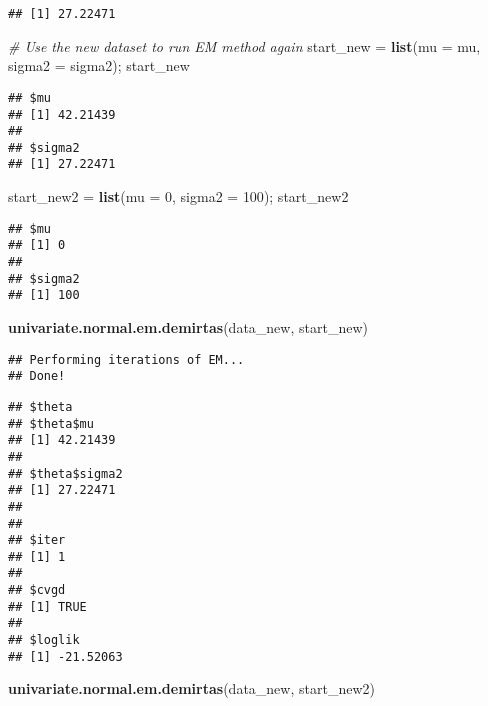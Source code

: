 \documentclass[]{article}
\newenvironment{Shaded}{\begin{snugshade}}{\end{snugshade}}
\newcommand{\CommentTok}[1]{\textcolor[rgb]{0.56,0.35,0.01}{\textit{#1}}}
\newcommand{\DataTypeTok}[1]{\textcolor[rgb]{0.13,0.29,0.53}{#1}}
\newcommand{\DecValTok}[1]{\textcolor[rgb]{0.00,0.00,0.81}{#1}}
\newcommand{\KeywordTok}[1]{\textcolor[rgb]{0.13,0.29,0.53}{\textbf{#1}}}
\newcommand{\NormalTok}[1]{#1}
\newcommand{\StringTok}[1]{\textcolor[rgb]{0.31,0.60,0.02}{#1}}
\begin{document}
\begin{verbatim}
## [1] 27.22471
\end{verbatim}

\begin{Shaded}
\begin{Highlighting}[]
\CommentTok{# Use the new dataset to run EM method again}
\NormalTok{start_new =}\StringTok{ }\KeywordTok{list}\NormalTok{(}\DataTypeTok{mu =}\NormalTok{ mu, }\DataTypeTok{sigma2 =}\NormalTok{ sigma2); start_new}
\end{Highlighting}
\end{Shaded}

\begin{verbatim}
## $mu
## [1] 42.21439
## 
## $sigma2
## [1] 27.22471
\end{verbatim}

\begin{Shaded}
\begin{Highlighting}[]
\NormalTok{start_new2 =}\StringTok{ }\KeywordTok{list}\NormalTok{(}\DataTypeTok{mu =} \DecValTok{0}\NormalTok{, }\DataTypeTok{sigma2 =} \DecValTok{100}\NormalTok{); start_new2}
\end{Highlighting}
\end{Shaded}

\begin{verbatim}
## $mu
## [1] 0
## 
## $sigma2
## [1] 100
\end{verbatim}

\begin{Shaded}
\begin{Highlighting}[]
\KeywordTok{univariate.normal.em.demirtas}\NormalTok{(data_new, start_new)}
\end{Highlighting}
\end{Shaded}

\begin{verbatim}
## Performing iterations of EM... 
## Done!
\end{verbatim}

\begin{verbatim}
## $theta
## $theta$mu
## [1] 42.21439
## 
## $theta$sigma2
## [1] 27.22471
## 
## 
## $iter
## [1] 1
## 
## $cvgd
## [1] TRUE
## 
## $loglik
## [1] -21.52063
\end{verbatim}

\begin{Shaded}
\begin{Highlighting}[]
\KeywordTok{univariate.normal.em.demirtas}\NormalTok{(data_new, start_new2)}
\end{Highlighting}
\end{Shaded}
\end{document}
